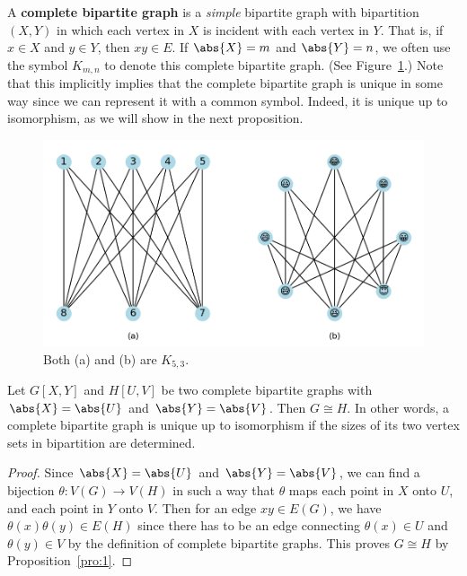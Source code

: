 \documentclass[thmcnt=section, 12pt, color=cyan]{my-elegantbook}
\begin{document}

A \textbf{complete bipartite graph} is a \textit{simple} bipartite graph with bipartition $(X, Y)$ in which each vertex in $X$ is incident with each vertex in $Y$. That is, if $x \in X$ and $y \in Y$, then $xy \in E$. If $\abs{X} = m$ and $\abs{Y} = n$, we often use the symbol $K_{m,n}$ to denote this complete bipartite graph. (See Figure~\ref{fig:2}.) Note that this implicitly implies that the complete bipartite graph is unique in some way since we can represent it with a common symbol. Indeed, it is unique up to isomorphism, as we will show in the next proposition.

\begin{figure}[ht]
    \centering
    \includegraphics[scale=0.7]{figures/g-002.png}
    \caption{Both (a) and (b) are $K_{5,3}$.}
    \label{fig:2}
\end{figure}

\begin{proposition}
    Let $G[X, Y]$ and $H[U, V]$ be two complete bipartite graphs with $\abs{X} = \abs{U}$ and $\abs{Y} = \abs{V}$. Then $G \cong H$. In other words, a complete bipartite graph is unique up to isomorphism if the sizes of its two vertex sets in bipartition are determined.
\end{proposition}

\begin{proof}
    Since $\abs{X} = \abs{U}$ and $\abs{Y} = \abs{V}$, we can find a bijection $\theta: V(G) \to V(H)$ in such a way that $\theta$ maps each point in $X$ onto $U$, and each point in $Y$ onto $V$. Then for an edge $xy \in E(G)$, we have $\theta(x)\theta(y) \in E(H)$ since there has to be an edge connecting $\theta(x) \in U$ and $\theta(y) \in V$ by the definition of complete bipartite graphs. This proves $G \cong H$ by Proposition~\ref{pro:1}.
\end{proof}
\end{document}
